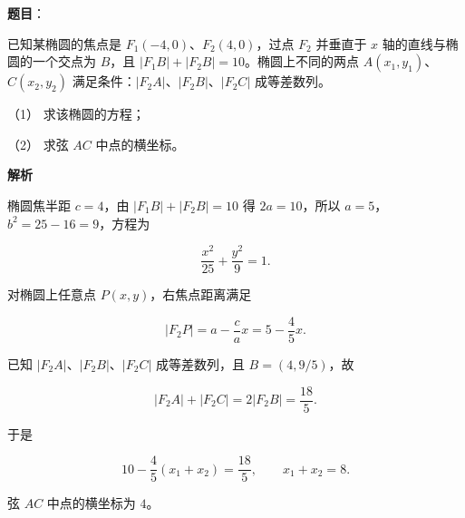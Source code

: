 \begin{answer}

\textbf{题目}：

已知某椭圆的焦点是 $F_1(-4,0)$、$F_2(4,0)$，过点 $F_2$ 并垂直于 $x$ 轴的直线与椭圆的一个交点为 $B$，且 $|F_1B|+|F_2B|=10$。椭圆上不同的两点 $A(x_1,y_1)$、$C(x_2,y_2)$ 满足条件：$|F_2A|\text{、}|F_2B|\text{、}|F_2C|$ 成等差数列。

（1） 求该椭圆的方程；

（2） 求弦 $AC$ 中点的横坐标。

\textbf{解析}


椭圆焦半距 $c=4$，由 $|F_1B|+|F_2B|=10$ 得 $2a=10$，所以 $a=5$，$b^2=25-16=9$，方程为

\nopagebreak[4]
\[
\frac{x^2}{25}+\frac{y^2}{9}=1.
\]


对椭圆上任意点 $P(x,y)$，右焦点距离满足

\nopagebreak[4]
\[
|F_2P|=a-\frac ca x=5-\frac45x.
\]

已知 $|F_2A|\text{、}|F_2B|\text{、}|F_2C|$ 成等差数列，且 $B=(4,9/5)$，故

\nopagebreak[4]
\[
|F_2A|+|F_2C|=2|F_2B|=\frac{18}{5}.
\]

于是

\nopagebreak[4]
\[
10-\frac45(x_1+x_2)=\frac{18}{5},
\qquad x_1+x_2=8.
\]

弦 $AC$ 中点的横坐标为 $4$。



\end{answer}
